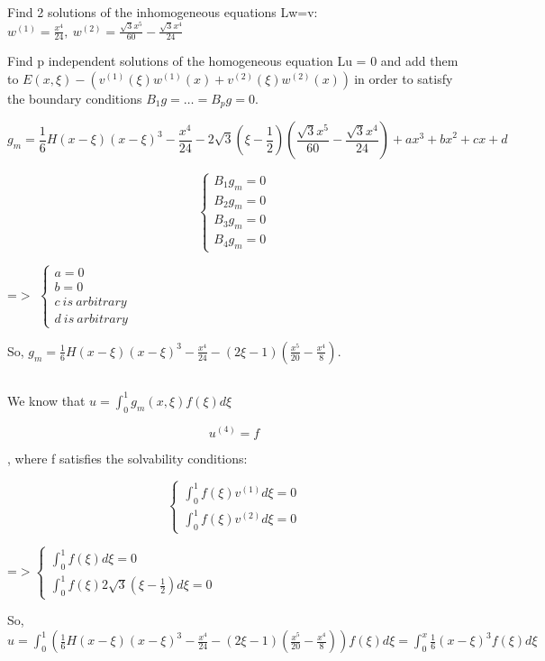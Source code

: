 \documentclass{article}
\begin{document}
{\raggedright
Find 2 solutions of the inhomogeneous equations Lw=v:
$w^{\left(1\right)}=\frac{x^4}{24},\
w^{(2)}=\frac{\sqrt{3}x^5}{60}-\frac{\sqrt{3}x^4}{24}$
}

{\raggedright
Find p independent solutions of the homogeneous equation Lu = 0 and add them to
$E\left(x,\xi{}\right)-\left(v^{\left(1\right)}\left(\xi{}\right)w^{\left(1\right)}\left(x\right)+v^{\left(2\right)}\left(\xi{}\right)w^{\left(2\right)}\left(x\right)\right)\
$in order to satisfy the boundary conditions $B_1g=…=B_pg=0$.
}


\[
g_m=\frac{1}{6}{H\left(x-\xi{}\right)\left(x-\xi{}\right)}^3-\frac{x^4}{24}-2\sqrt{3}\left(\xi{}-\frac{1}{2}\right)\left(\frac{\sqrt{3}x^5}{60}-\frac{\sqrt{3}x^4}{24}\right)+{ax}^3+{bx}^2+cx+d
\]


{\raggedright


\[
\left\{\begin{array}{l}B_1g_m=0 \\
B_2g_m=0 \\
B_3g_m=0 \\
B_4g_m=0\end{array}\right.
\]

=$>$ $\left\{\begin{array}{l}a=0 \\
b=0 \\
c\ is\ arbitrary \\
d\ is\ arbitrary\end{array}\right.$
}

{\raggedright
So,
$g_m=\frac{1}{6}{H\left(x-\xi{}\right)\left(x-\xi{}\right)}^3-\frac{x^4}{24}-\left(2\xi{}-1\right)\left(\frac{x^5}{20}-\frac{x^4}{8}\right)$.
}
\subsection{}

{\raggedright
We know that $u=\int_0^1g_m\left(x,\xi{}\right)f\left(\xi{}\right)d\xi{}$
}

{\raggedright


\[
u^{(4)}=f
\]

, where f satisfies the solvability conditions:
}

{\raggedright


\[
\left\{\begin{array}{l}\int_0^1f\left(\xi{}\right)v^{(1)}d\xi{}=0 \\
\int_0^1f\left(\xi{}\right)v^{(2)}d\xi{}=0\end{array}\right.
\]

=$>$$\left\{\begin{array}{l}\int_0^1f\left(\xi{}\right)d\xi{}=0 \\
\int_0^1f\left(\xi{}\right)2\sqrt{3}(\xi{}-\frac{1}{2})d\xi{}=0\end{array}\right.$
}

{\raggedright
So,
$u=\int_0^1(\frac{1}{6}{H\left(x-\xi{}\right)\left(x-\xi{}\right)}^3-\frac{x^4}{24}-\left(2\xi{}-1\right)\left(\frac{x^5}{20}-\frac{x^4}{8}\right))f\left(\xi{}\right)d\xi{}=\int_0^x\frac{1}{6}{\left(x-\xi{}\right)}^3f\left(\xi{}\right)d\xi{}$
}
\end{document}

